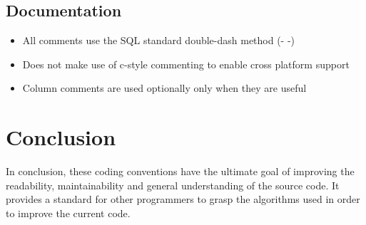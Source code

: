 \documentclass[11pt, a4paper]{article}
\begin{document}
\subsection{Documentation}
\begin{itemize}
	\item All comments use the SQL standard double-dash method (- -)
	\item Does not make use of c-style commenting to enable cross platform support
	\item Column comments are used optionally only when they are useful
\end{itemize}

\section{Conclusion}
In conclusion, these coding conventions have the ultimate goal of improving the readability, maintainability and general understanding of the source code. It provides a standard for other programmers to grasp the algorithms used in order to improve the current code.
\end{document}
